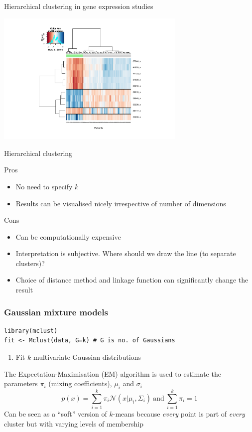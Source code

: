 \documentclass[pdf]{beamer}
\begin{document}
\begin{frame}{Hierarchical clustering in gene expression studies}
\begin{center}
	\includegraphics[width=0.68\textwidth]{geneExpression.pdf}
\end{center}
\end{frame}
\begin{frame}{Hierarchical clustering}
\begin{exampleblock}{Pros}
\begin{itemize}
	\item No need to specify $k$
	\item Results can be visualised nicely irrespective of number of dimensions 
\end{itemize}
\end{exampleblock}
\vfill
\begin{alertblock}{Cons}
\begin{itemize}
	\item Can be computationally expensive
	\item Interpretation is subjective. Where should we draw the line (to separate clusters)?
	\item Choice of distance method and linkage function can significantly change the result 
\end{itemize}
\end{alertblock}
\end{frame}
\begin{frame}[fragile]
\frametitle{Gaussian mixture models}
\begin{lstlisting}[style=RCode]
library(mclust)
fit <- Mclust(data, G=k) # G is no. of Gaussians
\end{lstlisting}
\begin{enumerate}
	\item Fit $k$ multivariate Gaussian distributions
\end{enumerate}
\vfill
The Expectation-Maximisation (EM) algorithm is used to estimate the parameters $\pi_i$ (mixing coefficients), $\mu_i$ and $\sigma_i$
$$
p(x) = \sum_{i=1}^k \pi_i \mathcal{N}(x|\mu_i, \Sigma_i)\ \mathrm{and}\ \sum_{i=1}^k \pi_i = 1
$$
Can be seen as a ``soft'' version of $k$-means because \textit{every} point is part of \textit{every} cluster but
with varying levels of membership
\end{frame}
\end{document}
